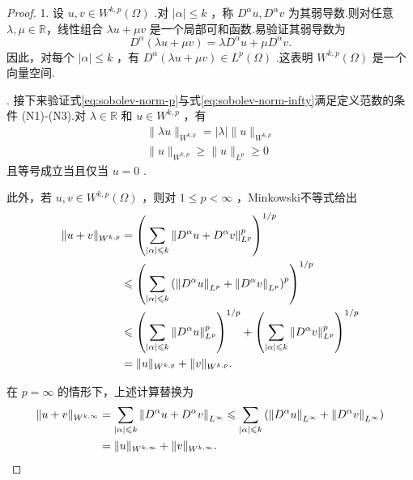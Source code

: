 \begin{proof}
1. 设 $u,v \in  {W}^{k,p}\left( \Omega \right)$ .对 $\left| \alpha \right|  \leq  k$ ，称 ${D}^{\alpha }u,{D}^{\alpha }v$ 为其弱导数.则对任意 $\lambda ,\mu  \in  \mathbb{R}$，线性组合 ${\lambda u} + {\mu v}$ 是一个局部可和函数.易验证其弱导数为
\begin{equation}\tag{8.24}\label{eq:sobolev-weak-derivative-linearity}
{D}^{\alpha }\left( {{\lambda u} + {\mu v}}\right)  = \lambda {D}^{\alpha }u + \mu {D}^{\alpha }v.
\end{equation}
因此，对每个 $\left| \alpha \right|  \leq  k$ ，有 ${D}^{\alpha }\left( {{\lambda u} + {\mu v}}\right)  \in  {L}^{p}\left( \Omega \right)$ .这表明 ${W}^{k,p}\left( \Omega \right)$ 是一个向量空间.


. 接下来验证式\eqref{eq:sobolev-norm-p}与式\eqref{eq:sobolev-norm-infty}满足定义范数的条件 (N1)-(N3).对 $\lambda  \in  \mathbb{R}$ 和 $u \in  {W}^{k,p}$ ，有
\begin{gather*}
    \| {\lambda u}{\| }_{{W}^{k,p}} = \left| \lambda \right| \| u{\| }_{{W}^{k,p}}\\
    \| u{\| }_{{W}^{k,p}} \geq  \| u{\| }_{{L}^{p}} \geq  0
\end{gather*}
且等号成立当且仅当 $u = 0$ .

此外，若 $u,v \in  {W}^{k,p}\left( \Omega \right)$ ，则对 $1 \leq  p < \infty$ ，Minkowski不等式给出
{\begin{align*}
    \| u + v{\| }_{{W}^{k,p}} &= {\left( \sum_{{\left| \alpha \right|  \leqslant  k}}{\norm{{D}^{\alpha }u + {D}^{\alpha }v}_{{L}^{p}}^{p}}\right) }^{1/p}\\
    &\leqslant  {\left( \sum_{{\left| \alpha \right|  \leqslant k}}{\left( {\norm{D^{\alpha }u}}_{{L}^{p}} + {\norm{D^{\alpha }v}}_{{L}^{p}}\right) }^{p}\right) }^{1/p}\\
    &\leqslant  {\left( \sum_{{\left| \alpha \right|  \leqslant k}}{\norm{D^{\alpha }u}_{{L}^{p}}^{p}}\right) }^{1/p} + {\left( \sum_{{\left| \alpha \right|  \leqslant  k}}{\norm{D^{\alpha }v}_{{L}^{p}}^{p}}\right) }^{1/p}\\
    &= \| u{\| }_{{W}^{k,p}} + \| v{\| }_{{W}^{k,p}}.
\end{align*}}

在 $p = \infty$ 的情形下，上述计算替换为
{\begin{align*}
    \| u + v{\| }_{{W}^{k,\infty }} &= \sum_{{\left| \alpha \right|  \leqslant  k}}{\norm{D^{\alpha }u + {D}^{\alpha }v}}_{{L}^{\infty }} \leqslant  \sum_{{\left| \alpha \right|  \leqslant  k}}\left( {{\norm{D^{\alpha }u}}_{{L}^{\infty }} + {\norm{D^{\alpha }v}}_{{L}^{\infty }}}\right)\\
    &= \| u{\| }_{{W}^{k,\infty }} + \| v{\| }_{{W}^{k,\infty }}.
\end{align*}}



\end{proof}
